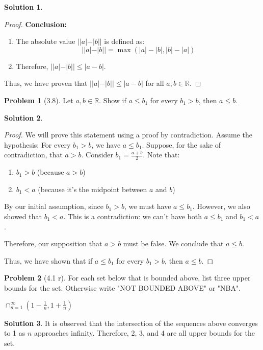 \documentclass[12pt]{article}
\theoremstyle{definition} %
\newtheorem{solution}{Solution}
\newtheorem{problem}{Problem}
\theoremstyle{plain} %
\begin{document}
\begin{solution}
\begin{proof}
            \textbf{Conclusion:}
            \begin{enumerate}
                \item The absolute value $||a| - |b||$ is defined as:
                $$
                ||a| - |b|| = \max(|a| - |b|, |b| - |a|)
                $$
                \item Therefore, $||a| - |b|| \leq |a - b|$.
            \end{enumerate}

        
        Thus, we have proven that $||a|-|b||\leq|a-b|$ for all $a,b \in \mathbb{R}$. 
    \end{proof}

\end{solution}







\begin{problem}[3.8]
 Let $a,b \in \mathbb{R}$. Show if $a\leq b_{1}$ for every $b_{1} > b$, then $a\leq b$.
   
\end{problem}

\begin{solution}
    \begin{proof}
     We will prove this statement using a proof by contradiction.
         Assume the hypothesis: For every $b_1 > b$, we have $a \leq b_1$.
         Suppose, for the sake of contradiction, that $a > b$.
         Consider $b_1 = \frac{a + b}{2}$. Note that:
        \begin{enumerate}
            \item $b_1 > b$ (because $a > b$)
            \item $b_1 < a$ (because it's the midpoint between $a$ and $b$)
        \end{enumerate}
        By our initial assumption, since $b_1 > b$, we must have $a \leq b_1$.
        However, we also showed that $b_1 < a$.
         This is a contradiction: we can't have both $a \leq b_1$ and $b_1 < a$.

    
    Therefore, our supposition that $a > b$ must be false. We conclude that $a \leq b$.
    
    Thus, we have shown that if $a \leq b_1$ for every $b_1 > b$, then $a \leq b$. 
    \end{proof}
    \end{solution}


\begin{problem}[4.1 r]
    
For each set below that is bounded above, list three upper bounds for the set. Otherwise write "NOT BOUNDED ABOVE" or "NBA".

$\cap_{n=1}^\infty\left( 1-\frac{1}{n}, 1+\frac{1}{n} \right)$ 

\end{problem}
\begin{solution}    
It is observed that the intersection of the sequences above converges to 1 as $n$ approaches infinity. Therefore, 2, 3, and 4 are all upper bounds for the set.
\end{solution}
\end{document}

